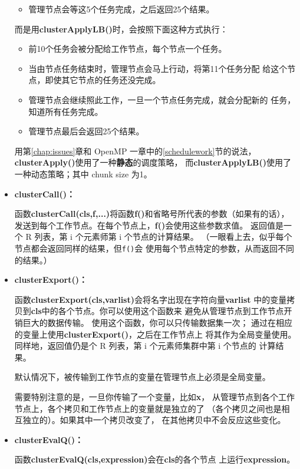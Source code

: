 \begin{itemize}
\begin{itemize}
\item 管理节点会等这5个任务完成，之后返回25个结果。

\end{itemize}

而是用{\bf clusterApplyLB()}时，会按照下面这种方式执行：

\begin{itemize}

\item 前10个任务会被分配给工作节点，每个节点一个任务。

\item 当由节点任务结束时，管理节点会马上行动，将第11个任务分配
给这个节点，即使其它节点的任务还没完成。

\item 管理节点会继续照此工作，一旦一个节点任务完成，就会分配新的
任务，知道所有任务完成。

\item 管理节点最后会返回25个结果。

\end{itemize}

用第\ref{chap:issues}章和 OpenMP 一章中的\ref{schedulework}节的说法，
{\bf clusterApply()}使用了一种{\bf 静态}的调度策略，
而{\bf clusterApplyLB()}使用了一种动态策略；其中 chunk size 为1。

\item {\bf clusterCall()：}

函数{\bf clusterCall(cls,f,...)}将函数{\bf f()}和省略号所代表的参数（如果有的话），
发送到每个工作节点。在每个节点上，{\bf f()}会使用这些参数求值。
返回值是一个 R 列表，第 i 个元素师第 i 个节点的计算结果。
（一眼看上去，似乎每个节点都会返回同样的结果，但{\tt f()}会
使用每个节点特定的参数，从而返回不同的结果。）

\item {\bf clusterExport()：}

函数{\bf clusterExport(cls,varlist)}会将名字出现在字符向量{\bf varlist}
中的变量拷贝到{\bf cls}中的各个节点。你可以使用这个函数来
避免从管理节点到工作节点开销巨大的数据传输。
使用这个函数，你可以只传输数据集一次；
通过在相应的变量上使用{\bf clusterExport()}，之后在工作节点上
将其作为全局变量使用。
同样地，返回值仍是个 R 列表，第 i 个元素师集群中第 i 个节点的
计算结果。

默认情况下，被传输到工作节点的变量在管理节点上必须是全局变量。

需要特别注意的是，一旦你传输了一个变量，比如{\bf x}，
从管理节点到各个工作节点上，各个拷贝和工作节点上的变量就是独立的了
（各个拷贝之间也是相互独立的）。如果其中一个拷贝改变了，
在其他拷贝中不会反应这些变化。

\item {\bf clusterEvalQ()：}

函数{\bf clusterEvalQ(cls,expression)}会在{\bf cls}的各个节点
上运行{\bf expression}。

\end{itemize}


